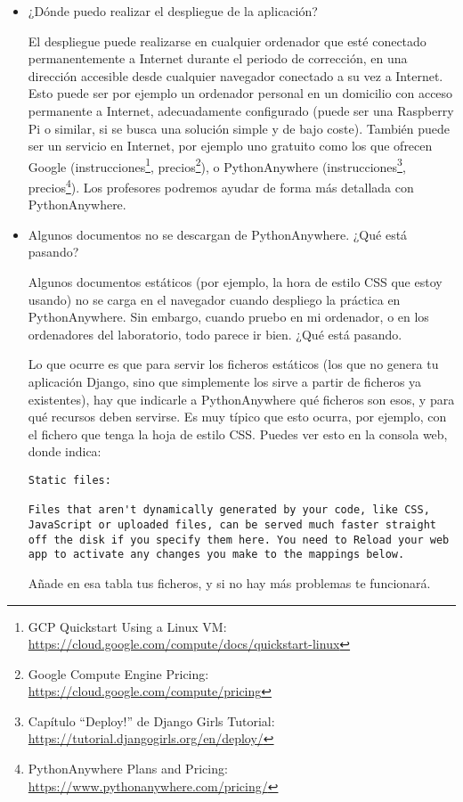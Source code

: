\begin{itemize}
\item ¿Dónde puedo realizar el despliegue de la aplicación?

  El despliegue puede realizarse en cualquier ordenador que esté conectado permanentemente a Internet durante el periodo de corrección, en una dirección accesible desde cualquier navegador conectado a su vez a Internet. Esto puede ser por ejemplo un ordenador personal en un domicilio con acceso permanente a Internet, adecuadamente configurado (puede ser una Raspberry Pi o similar, si se busca una solución simple y de bajo coste). También puede ser un servicio en Internet, por ejemplo uno gratuito como los que ofrecen Google (instrucciones\footnote{GCP Quickstart Using a Linux VM:\\ \url{https://cloud.google.com/compute/docs/quickstart-linux}}, precios\footnote{Google Compute Engine Pricing:\\ \url{https://cloud.google.com/compute/pricing}}), o PythonAnywhere (instrucciones\footnote{Capítulo ``Deploy!'' de Django Girls Tutorial:\\ \url{https://tutorial.djangogirls.org/en/deploy/}}, precios\footnote{PythonAnywhere Plans and Pricing:\\ \url{https://www.pythonanywhere.com/pricing/}}). Los profesores podremos ayudar de forma más detallada con PythonAnywhere.

\item Algunos documentos no se descargan de PythonAnywhere. ¿Qué está pasando?

  Algunos documentos estáticos (por ejemplo, la hora de estilo CSS que estoy usando) no se carga en el navegador cuando despliego la práctica en PythonAnywhere. Sin embargo, cuando pruebo en mi ordenador, o en los ordenadores del laboratorio, todo parece ir bien. ¿Qué está pasando.

  Lo que ocurre es que para servir los ficheros estáticos (los que no genera tu aplicación Django, sino que simplemente los sirve a partir de ficheros ya existentes), hay que indicarle a PythonAnywhere qué ficheros son esos, y para qué recursos deben servirse. Es muy típico que esto ocurra, por ejemplo, con el fichero que tenga la hoja de estilo CSS. Puedes ver esto en la consola web, donde indica:

  \begin{verbatim}
Static files:

Files that aren't dynamically generated by your code, like CSS, JavaScript or uploaded files, can be served much faster straight off the disk if you specify them here. You need to Reload your web app to activate any changes you make to the mappings below.
\end{verbatim}

  Añade en esa tabla tus ficheros, y si no hay más problemas te funcionará.

\end{itemize}
